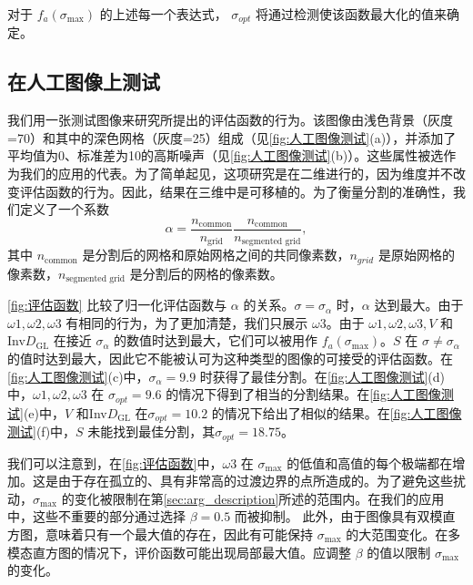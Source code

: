 对于 $f_{a}(\sigma_{\text{max}})$ 的上述每一个表达式， $\sigma_{opt}$ 将通过检测使该函数最大化的值来确定。

\subsection{在人工图像上测试}\label{sec:test}

我们用一张测试图像来研究所提出的评估函数的行为。该图像由浅色背景（灰度=70）和其中的深色网格（灰度=25）组成（见\cref{fig:人工图像测试}(a)），并添加了平均值为0、标准差为10的高斯噪声（见\cref{fig:人工图像测试}(b)）。这些属性被选作为我们的应用的代表。为了简单起见，这项研究是在二维进行的，因为维度并不改变评估函数的行为。因此，结果在三维中是可移植的。为了衡量分割的准确性，我们定义了一个系数
\begin{equation}
    \alpha = \frac{n_{\text{common}}}{n_{\text{grid}}}\frac{n_{\text{common}}}{n_{\text{segmented grid}}},
\end{equation}
其中 $n_{\text{common}}$ 是分割后的网格和原始网格之间的共同像素数，$n_{grid}$ 是原始网格的像素数，$n_{\text{segmented grid}}$ 是分割后的网格的像素数。

\cref{fig:评估函数} 比较了归一化评估函数与 $\alpha$ 的关系。$\sigma = \sigma_{\alpha}$ 时，$\alpha$ 达到最大。由于 $\omega1,\omega2,\omega3$ 有相同的行为，为了更加清楚，我们只展示 $\omega3$。由于 $\omega1,\omega2,\omega3,V$ 和 Inv$D_{\text{GL}}$ 在接近 $\sigma_{\alpha}$ 的数值时达到最大，它们可以被用作 $f_{a}(\sigma_{\text{max}})$。$S$ 在 $\sigma \neq \sigma_{\alpha}$ 的值时达到最大，因此它不能被认可为这种类型的图像的可接受的评估函数。在\cref{fig:人工图像测试}(c)中，$\sigma_{\alpha} = 9.9$ 时获得了最佳分割。在\cref{fig:人工图像测试}(d)中，$\omega1,\omega2,\omega3$ 在 $\sigma_{opt} = 9.6$ 的情况下得到了相当的分割结果。在\cref{fig:人工图像测试}(e)中，$V$ 和Inv$D_{\text{GL}}$ 在$\sigma_{opt} = 10.2$ 的情况下给出了相似的结果。在\cref{fig:人工图像测试}(f)中，$S$ 未能找到最佳分割，其$\sigma_{opt} = 18.75$。

我们可以注意到，在\cref{fig:评估函数}中，$\omega3$ 在 $\sigma_{\text{max}}$ 的低值和高值的每个极端都在增加。这是由于存在孤立的、具有非常高的过渡边界的点所造成的。为了避免这些扰动，$\sigma_{\text{max}}$ 的变化被限制在第\cref{sec:arg_description}所述的范围内。在我们的应用中，这些不重要的部分通过选择 $\beta=0.5$ 而被抑制。 此外，由于图像具有双模直方图，意味着只有一个最大值的存在，因此有可能保持 $\sigma_{\text{max}}$ 的大范围变化。在多模态直方图的情况下，评价函数可能出现局部最大值。应调整 $\beta$ 的值以限制 $\sigma_{\text{max}}$ 的变化。

